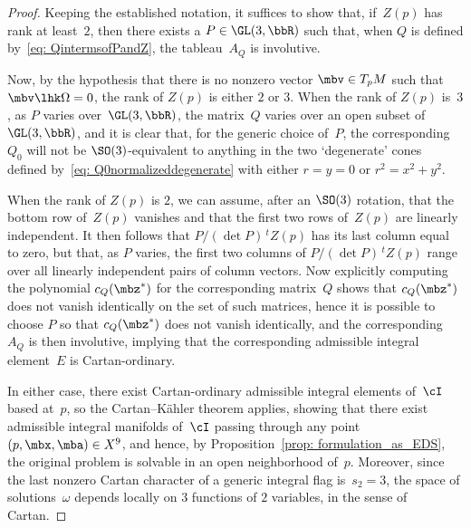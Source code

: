 \begin{proof}Keeping the established notation, it suffices to show that, if~$Z(p)$ has rank at least~$2$, then there exists a $P\in\GL(3,\bbR)$ such that, when $Q$ is defined by~\eqref{eq: QintermsofPandZ}, the tableau~$A_Q$ is involutive.

Now, by the hypothesis that there is no nonzero vector $\mbv\in T_pM$
such that $\mbv\lhk\Omega=0$, the rank of $Z(p)$ is either $2$ or $3$.
When the rank of $Z(p)$ is~$3$,
as $P$ varies over~$\GL(3,\bbR)$,
the matrix~$Q$ varies over an open subset of~$\GL(3,\bbR)$,
and it is clear that, for the generic choice of~$P$,
the corresponding $Q_0$ will not be $\SO(3)$-equivalent to anything
in the two `degenerate' cones defined by~\eqref{eq: Q0normalizeddegenerate}
with either $r=y=0$ or $r^2=x^2+y^2$.

When the rank of $Z(p)$ is $2$, we can assume, after an $\SO(3)$ rotation,
that the bottom row of~$Z(p)$ vanishes and that the first two rows of~$Z(p)$
are linearly independent. It then follows that $P/(\det P)\, {}^t\!Z(p)$
has its last column equal to zero, but that, as $P$ varies, the first
two columns of $P/(\det P)\, {}^t\!Z(p)$ range over all linearly independent
pairs of column vectors. Now explicitly computing the polynomial $c_Q(\mbz^*)$
for the corresponding matrix~$Q$ shows that $c_Q(\mbz^*)$ does not vanish
identically on the set of such matrices, hence it is possible to choose $P$
so that $c_Q(\mbz^*)$ does not vanish identically, and the corresponding $A_Q$
is then involutive, implying that the corresponding admissible integral
element~$E$ is Cartan-ordinary.

In either case, there exist Cartan-ordinary admissible integral elements
of~$\cI$ based at~$p$, so the Cartan--K\"ahler theorem applies, showing
that there exist admissible integral manifolds of~$\cI$ passing through
any point~$(p,\mbx,\mba)\in X^9$, and hence,
by Proposition~\ref{prop: formulation_as_EDS},
the original problem is solvable in an open neighborhood of~$p$.
Moreover, since the last nonzero Cartan character
of a generic integral flag is~$s_2 = 3$,
the space of solutions~$\omega$
depends locally on $3$ functions of $2$ variables,
in the sense of Cartan.
\end{proof}
